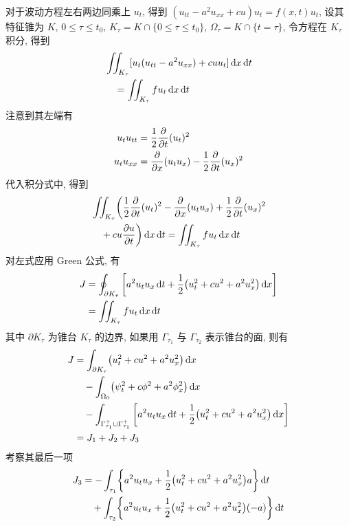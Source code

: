 \begin{solution}
对于波动方程左右两边同乘上 $u_t$, 得到
$(u_{tt} - a^2 u_{xx} + cu) u_t = f(x, t) u_t$, 设其特征锥为 $K$,
$0 \leq \tau \leq t_0$, $K_\tau = K \cap \{0 \leq \tau \leq t_0\}$,
$\Omega_\tau = K \cap \{t = \tau\}$, 令方程在 $K_\tau$ 积分, 得到
\begin{align*}
&\iint_{K_\tau} [ u_t(u_{tt} - a^2 u_{xx}) + c u u_t ] \operatorname{d\!} x \operatorname{d\!} t \\
&\quad= \iint_{K_\tau} f u_t \operatorname{d\!} x \operatorname{d\!} t
\end{align*}
注意到其左端有
\begin{align*}
    u_t u_{tt} &= \frac12{{\frac{\partial {}}{\partial {t}}}}(u_t)^2 \\
    u_t u_{xx} &= {{\frac{\partial {}}{\partial {x}}}} (u_t u_x) - \frac12{{\frac{\partial {}}{\partial {t}}}}(u_x)^2
\end{align*}
代入积分式中, 得到
\begin{align*}
&\iint_{K_\tau} \biggl(
    \frac12{{\frac{\partial {}}{\partial {t}}}}(u_t)^2 - {{\frac{\partial {}}{\partial {x}}}} (u_t u_x)
    + \frac12{{\frac{\partial {}}{\partial {t}}}}(u_x)^2 \\
&\quad+ c u {\frac{\partial {u}}{\partial {t}}} \biggr) \operatorname{d\!} x \operatorname{d\!} t
    = \iint_{K_\tau} f u_t \operatorname{d\!} x \operatorname{d\!} t
\end{align*}
对左式应用 Green 公式, 有
\begin{align*}
J &= \oint_{\partial K_\tau} {\left[ {
    a^2 u_t u_x \operatorname{d\!} t + \frac12 \bigl(u_t^2 + c u^2 + a^2 u_x^2\bigr)\operatorname{d\!} x
} \right]} \\
&= \iint_{K_\tau} f u_t \operatorname{d\!} x \operatorname{d\!} t
\end{align*}
其中 $\partial K_\tau$ 为锥台 $K_\tau$ 的边界, 如果用 $\Gamma_{\tau_1}$ 与
$\Gamma_{\tau_2}$ 表示锥台的面, 则有
\begin{align*}
J &= \int_{\partial K_\tau} \bigl(u_t^2 + c u^2 + a^2 u_x^2\bigr)\operatorname{d\!} x \\
&\quad- \int_{\Omega_0} \bigl( \psi_t^2 + c \phi^2
    + a^2 \phi_x^2 \bigr) \operatorname{d\!} x \\
&\quad- \int_{\Gamma_{\tau_1}^+ \cup \Gamma_{\tau_1}^+} {\left[ {
    a^2 u_t u_x \operatorname{d\!} t + \frac12 \bigl(u_t^2 + c u^2 + a^2 u_x^2\bigr)  
    \operatorname{d\!} x } \right]} \\
&= J_1 + J_2 + J_3
\end{align*}
考察其最后一项
\begin{align*}
J_3 &= -\int_{\tau_1} \biggl\{ a^2 u_t u_x
    + \frac12 \bigl( u_t^2 + c u^2 + a^2 u_x^2 \bigr) a \biggr\} \diff t \\
&\quad+ \int_{\tau_2} \biggl\{ a^2 u_t u_x
    + \frac12 \bigl( u_t^2 + c u^2 + a^2 u_x^2 \bigr) (-a) \biggr\} \diff t \\

\end{align*}
\end{solution}
